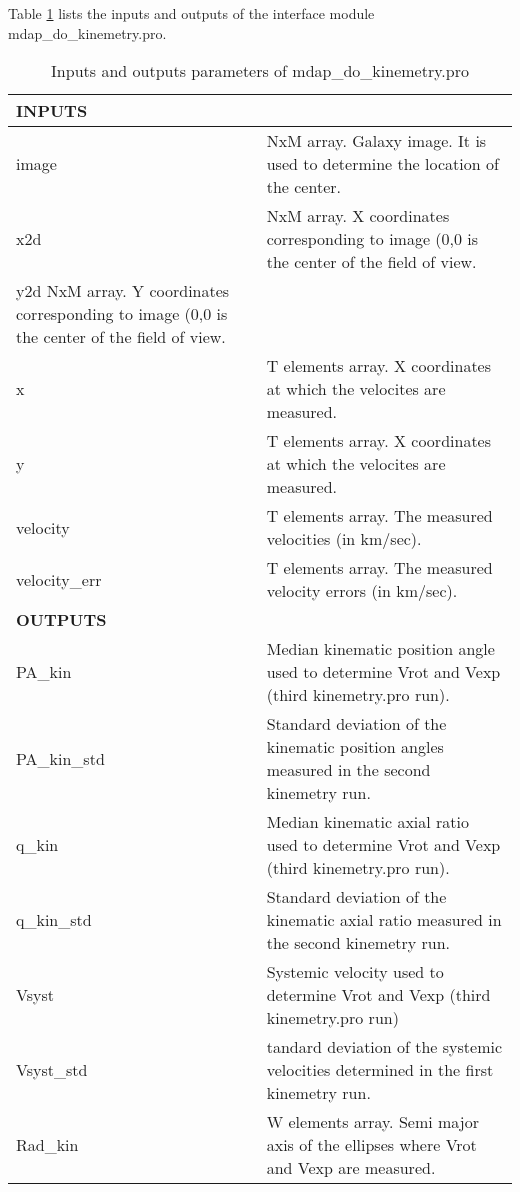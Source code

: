 Table \ref{dap_tab:mdap_do_kinemetry} lists the inputs and outputs of
the interface module mdap\_do\_kinemetry.pro.

\begin{center}
\begin{longtable}{p{2.7cm}| p{11.1cm}}
\caption{Inputs and outputs parameters of
  mdap\_do\_kinemetry.pro} \label{dap_tab:mdap_do_kinemetry}
\\ \hline \endfirsthead

\hline
\endhead

\hline
\endlastfoot

\hline 
{\bf INPUTS} & \\ 
\hline 

image & NxM array. Galaxy image. It is used to determine the location
        of the center.\\
%
x2d & NxM array. X coordinates corresponding to image (0,0 is the
     center of the field of view.\\
% 
y2d NxM array. Y coordinates corresponding to image (0,0 is the
     center of the field of view.\\
%
x & T elements array. X coordinates at which the velocites are measured. \\
%
y & T elements array. X coordinates at which the velocites are measured. \\
%
velocity & T elements array. The measured velocities (in km/sec).\\
%
velocity\_err & T elements array. The measured velocity errors (in km/sec).\\
%
\hline
{\bf OUTPUTS} & \\
\hline
PA\_kin &    Median kinematic position angle used to determine Vrot and Vexp (third kinemetry.pro run). \\ 
%
PA\_kin\_std & Standard deviation of the kinematic position angles measured in the second kinemetry run. \\
%
q\_kin &  Median kinematic axial ratio used to determine Vrot and Vexp (third kinemetry.pro run). \\ 
%
q\_kin\_std & Standard deviation of the kinematic axial ratio measured in the second kinemetry run. \ \\ 
%
Vsyst & Systemic velocity used to determine Vrot and Vexp (third kinemetry.pro run) \\ 
%
Vsyst\_std & tandard deviation of the systemic velocities determined in the first kinemetry run.\\ 
%
Rad\_kin & W elements array. Semi major axis of the ellipses where Vrot and Vexp are measured. \\ 

\end{longtable}
\end{center}
